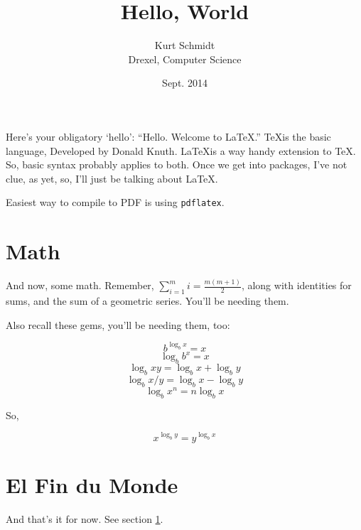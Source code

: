 \documentclass[a4paper,12pt,titlepage]{article}
\title{Hello, World}
\author{Kurt Schmidt \\
	Drexel, Computer Science}
\date{Sept. 2014}
\begin{document}
\maketitle

Here's your obligatory `hello':  ``Hello.  Welcome to \LaTeX.''  \TeX is the
basic language, Developed by Donald Knuth.  \LaTeX is a way handy extension
to \TeX.  So, basic syntax probably applies to both.  Once we get into
packages, I've not clue, as yet, so, I'll just be talking about \LaTeX.

Easiest way to compile to PDF is using \texttt{pdflatex}.

\section{Math}
\label{hellomath}

And now, some math.  Remember, $\sum_{i=1}^m i = \frac{m(m+1)}{2}$, along
with identities for sums, and the sum of a geometric series.  You'll be
needing them.

Also recall these gems, you'll be needing them, too:

\[ b^{\log_{b}{x}} = x \]
\[ \log_{b}{b^x} = x \]
\[ \log_{b}{xy} = \log_{b}{x} + \log_{b}{y} \]
\[ \log_{b}{x/y} = \log_{b}{x} - \log_{b}{y} \]
\[ \log_{b}{x^n} = n\log_{b}{x} \]

So, 

\[ x^{\log_{b}{y}} = y^{\log_{b}{x}} \]

\section*{El Fin du Monde}
\label{end}

And that's it for now.  See section \ref{hellomath}.
\end{document}
